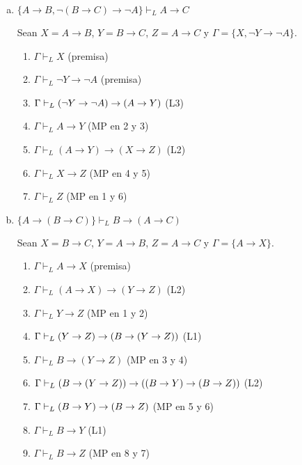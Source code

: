 \begin{enumerate}[(a)]
    \item $\{ A \to B, \neg (B \to C) \to \neg A \} \vdash_L A \to C$
    \begin{solution}
    Sean $X = A \to B$, $Y = B \to C$, $Z = A \to C$ y $\Gamma = \{ X, \neg Y \to \neg A \}$.
    \begin{enumerate}[1.]
        \item $\Gamma \vdash_L X$                       \hfill (premisa)
        \item $\Gamma \vdash_L \neg Y \to \neg A$       \hfill (premisa)
        \item $\Gamma \vdash_L (\neg Y \to \neg A) \to (A \to Y)$                  \hfill (L3)
        \item $\Gamma \vdash_L A \to Y$                 \hfill (MP en 2 y 3)
        \item $\Gamma \vdash_L (A \to Y) \to (X \to Z)$ \hfill (L2)
        \item $\Gamma \vdash_L X \to Z$                 \hfill (MP en 4 y 5)
        \item $\Gamma \vdash_L Z$                       \hfill (MP en 1 y 6)
    \end{enumerate}
    \end{solution}
    
    \item $\{ A \to (B \to C) \} \vdash_L B \to (A \to C)$
    \begin{solution}
    Sean $X = B \to C$, $Y = A \to B$, $Z = A \to C$ y $\Gamma = \{ A \to X \}$.
    \begin{enumerate}[1.]
        \item $\Gamma \vdash_L A \to X$                 \hfill (premisa)
        \item $\Gamma \vdash_L (A \to X) \to (Y \to Z)$ \hfill (L2)
        \item $\Gamma \vdash_L Y \to Z$                 \hfill (MP en 1 y 2)
        \item $\Gamma \vdash_L (Y \to Z) \to (B \to (Y \to Z))$       \hfill (L1)
        \item $\Gamma \vdash_L B \to (Y \to Z)$         \hfill (MP en 3 y 4)
        \item $\Gamma \vdash_L (B \to (Y \to Z)) \to ((B \to Y) \to (B \to Z))$                 \hfill (L2)
        \item $\Gamma \vdash_L (B \to Y) \to (B \to Z)$                \hfill (MP en 5 y 6)
        \item $\Gamma \vdash_L B \to Y$                 \hfill (L1)
        \item $\Gamma \vdash_L B \to Z$                 \hfill (MP en 8 y 7)
    \end{enumerate}
    \end{solution}
\end{enumerate}
